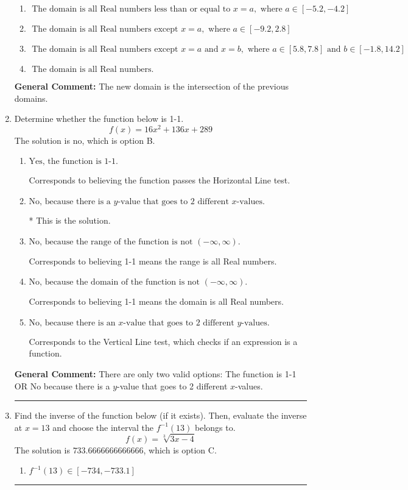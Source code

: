 \documentclass{extbook}[14pt]
\newcommand{\litem}[1]{\item #1

\rule{\textwidth}{0.4pt}}
\begin{document}
\begin{enumerate}
{\begin{enumerate}[label=\Alph*.]
\item \( \text{ The domain is all Real numbers less than or equal to } x = a, \text{ where } a \in [-5.2, -4.2] \)


\item \( \text{ The domain is all Real numbers except } x = a, \text{ where } a \in [-9.2, 2.8] \)


\item \( \text{ The domain is all Real numbers except } x = a \text{ and } x = b, \text{ where } a \in [5.8, 7.8] \text{ and } b \in [-1.8, 14.2] \)


\item \( \text{ The domain is all Real numbers. } \)


\end{enumerate}

\textbf{General Comment:} The new domain is the intersection of the previous domains.
}
\litem{
Determine whether the function below is 1-1.
\[ f(x) = 16 x^2 + 136 x + 289 \]The solution is \( \text{no} \), which is option B.\begin{enumerate}[label=\Alph*.]
\item \( \text{Yes, the function is 1-1.} \)

Corresponds to believing the function passes the Horizontal Line test.
\item \( \text{No, because there is a $y$-value that goes to 2 different $x$-values.} \)

* This is the solution.
\item \( \text{No, because the range of the function is not $(-\infty, \infty)$.} \)

Corresponds to believing 1-1 means the range is all Real numbers.
\item \( \text{No, because the domain of the function is not $(-\infty, \infty)$.} \)

Corresponds to believing 1-1 means the domain is all Real numbers.
\item \( \text{No, because there is an $x$-value that goes to 2 different $y$-values.} \)

Corresponds to the Vertical Line test, which checks if an expression is a function.
\end{enumerate}

\textbf{General Comment:} There are only two valid options: The function is 1-1 OR No because there is a $y$-value that goes to 2 different $x$-values.
}
\litem{
Find the inverse of the function below (if it exists). Then, evaluate the inverse at $x = 13$ and choose the interval the $f^{-1}(13)$ belongs to.
\[ f(x) = \sqrt[3]{3 x - 4} \]The solution is \( 733.6666666666666 \), which is option C.\begin{enumerate}[label=\Alph*.]
\item \( f^{-1}(13) \in [-734, -733.1] \)


\end{enumerate}}
\end{enumerate}
\end{document}
